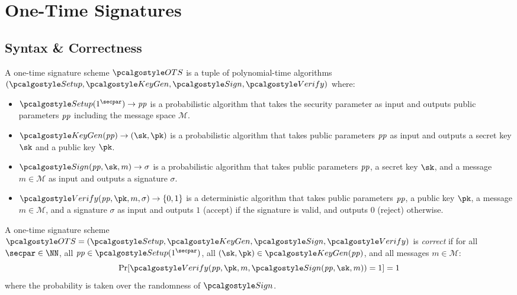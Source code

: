 \section{One-Time Signatures}\label{sec:one-time-sigs}

\subsection{Syntax \& Correctness}

\begin{definition}
    A one-time signature scheme $\algo{OTS}$ is a tuple of polynomial-time algorithms $(\algo{Setup}, \algo{KeyGen}, \algo{Sign}, \algo{Verify})$ where:
    \begin{itemize}
        \item $\algo{Setup}(1^\secpar) \rightarrow \params$ is a probabilistic algorithm that takes the security parameter as input and outputs public parameters $\mathit{pp}$ including the message space $\mathcal{M}$.
        \item $\algo{KeyGen}(\params) \rightarrow (\sk, \pk)$ is a probabilistic algorithm that takes public parameters $\mathit{pp}$ as input and outputs a secret key $\sk$ and a public key $\pk$.
        \item $\algo{Sign}(\params, \sk, m) \rightarrow \sigma$ is a probabilistic algorithm that takes public parameters $\mathit{pp}$, a secret key $\sk$, and a message $m \in \mathcal{M}$ as input and outputs a signature $\sigma$.
        \item $\algo{Verify}(\params, \pk, m, \sigma) \rightarrow \{0, 1\}$ is a deterministic algorithm that takes public parameters $\mathit{pp}$, a public key $\pk$, a message $m \in \mathcal{M}$, and a signature $\sigma$ as input and outputs $1$ (accept) if the signature is valid, and outputs $0$ (reject) otherwise.
    \end{itemize}
\end{definition}

\begin{definition}[Correctness]\label{def:ots-correctness}
  A one-time signature scheme $\algo{OTS} = (\algo{Setup}, \algo{KeyGen}, \algo{Sign}, \algo{Verify})$ is \emph{correct} if for all $\secpar \in \NN$, all $\params \in \algo{Setup}(1^\secpar)$, all $(\sk, \pk) \in \algo{KeyGen}(\params)$, and all messages $m \in \mathcal{M}$:
  \[
    \Pr[\algo{Verify}(\params, \pk, m, \algo{Sign}(\params, \sk, m)) = 1] = 1
  \]
  where the probability is taken over the randomness of $\algo{Sign}$.
\end{definition}

